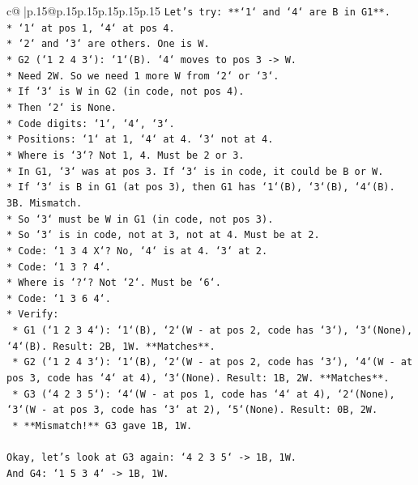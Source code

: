 \documentclass{article}
\begin{document}
{\begin{supertabular}{c@{$\;$}|p{.15\linewidth}@{}p{.15\linewidth}p{.15\linewidth}p{.15\linewidth}p{.15\linewidth}p{.15\linewidth}}
{{{\texttt{Let's try: **`1` and `4` are B in G1**.} \\
\texttt{*   `1` at pos 1, `4` at pos 4.} \\
\texttt{*   `2` and `3` are others. One is W.} \\
\texttt{*   G2 (`1 2 4 3`): `1`(B). `4` moves to pos 3 {-}> W.} \\
\texttt{*   Need 2W. So we need 1 more W from `2` or `3`.} \\
\texttt{*   If `3` is W in G2 (in code, not pos 4).} \\
\texttt{*   Then `2` is None.} \\
\texttt{*   Code digits: `1`, `4`, `3`.} \\
\texttt{*   Positions: `1` at 1, `4` at 4. `3` not at 4.} \\
\texttt{*   Where is `3`? Not 1, 4. Must be 2 or 3.} \\
\texttt{*   In G1, `3` was at pos 3. If `3` is in code, it could be B or W.} \\
\texttt{*   If `3` is B in G1 (at pos 3), then G1 has `1`(B), `3`(B), `4`(B). 3B. Mismatch.} \\
\texttt{*   So `3` must be W in G1 (in code, not pos 3).} \\
\texttt{*   So `3` is in code, not at 3, not at 4. Must be at 2.} \\
\texttt{*   Code: `1 3 4 X`? No, `4` is at 4. `3` at 2.} \\
\texttt{*   Code: `1 3 ? 4`.} \\
\texttt{*   Where is `?`? Not `2`. Must be `6`.} \\
\texttt{*   Code: `1 3 6 4`.} \\
\texttt{*   Verify:} \\
\texttt{    *   G1 (`1 2 3 4`): `1`(B), `2`(W {-} at pos 2, code has `3`), `3`(None), `4`(B). Result: 2B, 1W. **Matches**.} \\
\texttt{    *   G2 (`1 2 4 3`): `1`(B), `2`(W {-} at pos 2, code has `3`), `4`(W {-} at pos 3, code has `4` at 4), `3`(None). Result: 1B, 2W. **Matches**.} \\
\texttt{    *   G3 (`4 2 3 5`): `4`(W {-} at pos 1, code has `4` at 4), `2`(None), `3`(W {-} at pos 3, code has `3` at 2), `5`(None). Result: 0B, 2W.} \\
\texttt{    *   **Mismatch!** G3 gave 1B, 1W.} \\
\\ 
\texttt{Okay, let's look at G3 again: `4 2 3 5` {-}> 1B, 1W.} \\
\texttt{And G4: `1 5 3 4` {-}> 1B, 1W.} \\
}}}
\end{supertabular}}
\end{document}
